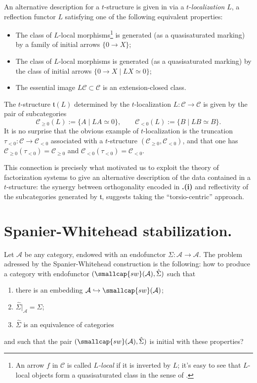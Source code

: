 \documentclass[11pt, a4paper]{amsart}
\newcommand{\tee}{\mathfrak{t}}
\renewcommand{\C}{\mathcal{C}}
\renewcommand{\A}{\mathcal{A}}
\begin{document}
\begin{remark}
An alternative description for a $t$-structure is given in \cite[Prop. \textbf{1.2.1.16}]{LurieHA} via a $t$-\emph{localization} $L$, \ie a reflection functor $L$ satisfying one of the following equivalent properties:
\begin{itemize}
\item The class of $L$-local morphisms\footnote{An arrow $f$ in $\C$ is called \emph{$L$-local} if it is inverted by $L$; it's easy to see that $L$-local objects form a quasisaturated class in the sense of \cite[Def. \textbf{1.2.1.14}]{LurieHA}.} is generated (as a quasisaturated marking) by a family of initial arrows $\{0\to X\}$;
\item The class of $L$-local morphisms is generated (as a quasisaturated marking) by the class of initial arrows $\{0\to X\mid LX\simeq 0\}$; 
\item The essential image $L\C\subset\C$ is an extension-closed class.
\end{itemize}
The $t$-structure $\tee(L)$ determined by the $t$-localization $L\colon \C\to \C$ is given by the pair of subcategories
\[
\C_{\ge 0}(L) := \{A\mid LA\simeq 0\},\qquad \C_{<0}(L) := \{B\mid LB\simeq B\} .
\]
It is no surprise that the obvious example of $t$-localization is the truncation $\tau_{<0}:\C\to\C_{<0}$ associated with a $t$-structure $(\C_{\geq0},\C_{<0})$, and that one has $\C_{\ge 0}(\tau_{<0})=\C_{\ge 0}$ and $\C_{< 0}(\tau_{<0})=\C_{< 0}$.
\end{remark}
This connection is precisely what motivated us to exploit the theory of factorization systems to give an alternative description of the data contained in a $t$-structure: the synergy between orthogonality encoded in \textbf{.(i)} and reflectivity of the subcategories generated by $\tee$, suggests taking the ``torsio-centric'' approach.
\section{Spanier-Whitehead stabilization.}\label{spanierwhite}
Let $\A$ be any category, endowed with an endofunctor $\Sigma\colon \A\to \A$. The problem adressed by the Spanier-Whitehead construction is the following: how to produce a category with endofunctor $(\smallcap{sw}(\A), \hat \Sigma)$ such that 
\begin{enumerate}
\item there is an embedding $\A \hookrightarrow \smallcap{sw}(\A)$; 
\item $\hat \Sigma|_{\A} = \Sigma$;
\item $\hat \Sigma$ is an equivalence of categories
\end{enumerate}
and such that the pair $(\smallcap{sw}(\A), \hat \Sigma)$ is initial with these properties?
\end{document}
